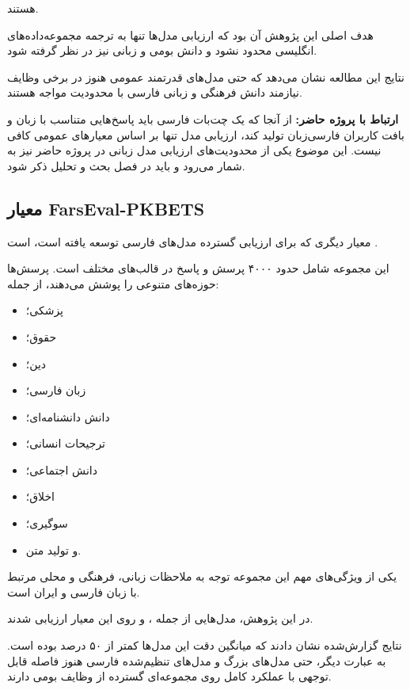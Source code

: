 هستند.

هدف اصلی این پژوهش آن بود که ارزیابی مدل‌ها تنها به ترجمه
مجموعه‌داده‌های انگلیسی محدود نشود و دانش بومی و زبانی نیز
در نظر گرفته شود.

نتایج این مطالعه نشان می‌دهد که حتی مدل‌های قدرتمند عمومی
هنوز در برخی وظایف نیازمند دانش فرهنگی و زبانی فارسی با
محدودیت مواجه هستند.

\textbf{ارتباط با پروژه حاضر:}
از آنجا که یک چت‌بات فارسی باید پاسخ‌هایی متناسب با زبان
و بافت کاربران فارسی‌زبان تولید کند، ارزیابی مدل تنها بر اساس
معیارهای عمومی کافی نیست.
این موضوع یکی از محدودیت‌های ارزیابی مدل زبانی در پروژه حاضر
نیز به شمار می‌رود و باید در فصل بحث و تحلیل ذکر شود.


\subsection{معیار FarsEval-PKBETS}

معیار دیگری که برای ارزیابی گسترده مدل‌های فارسی توسعه یافته
است،
است
\cite{shamsfard2025farseval}.

این مجموعه شامل حدود ۴۰۰۰ پرسش و پاسخ در قالب‌های مختلف
است.
پرسش‌ها حوزه‌های متنوعی را پوشش می‌دهند، از جمله:

\begin{itemize}

    \item پزشکی؛
    \item حقوق؛
    \item دین؛
    \item زبان فارسی؛
    \item دانش دانشنامه‌ای؛
    \item ترجیحات انسانی؛
    \item دانش اجتماعی؛
    \item اخلاق؛
    \item سوگیری؛
    \item و تولید متن.
\end{itemize}

یکی از ویژگی‌های مهم این مجموعه توجه به ملاحظات زبانی،
فرهنگی و محلی مرتبط با زبان فارسی و ایران است.

در این پژوهش، مدل‌هایی از جمله
،
و
روی این معیار ارزیابی شدند.

نتایج گزارش‌شده نشان دادند که میانگین دقت این مدل‌ها کمتر
از ۵۰ درصد بوده است.
به عبارت دیگر، حتی مدل‌های بزرگ و مدل‌های تنظیم‌شده فارسی
هنوز فاصله قابل توجهی با عملکرد کامل روی مجموعه‌ای گسترده
از وظایف بومی دارند.

